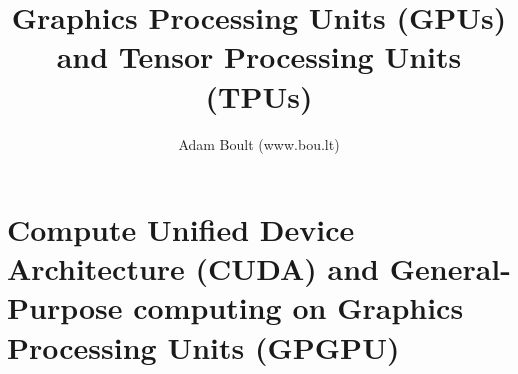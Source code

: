\documentclass[oneside]{book}
\begin{document}
\author{Adam Boult (www.bou.lt)}
\title{Graphics Processing Units (GPUs) and Tensor Processing Units (TPUs)}
\maketitle

\setcounter{tocdepth}{0}
\tableofcontents




\part{Compute Unified Device Architecture (CUDA) and General-Purpose computing on Graphics Processing Units (GPGPU)}
\end{document}
